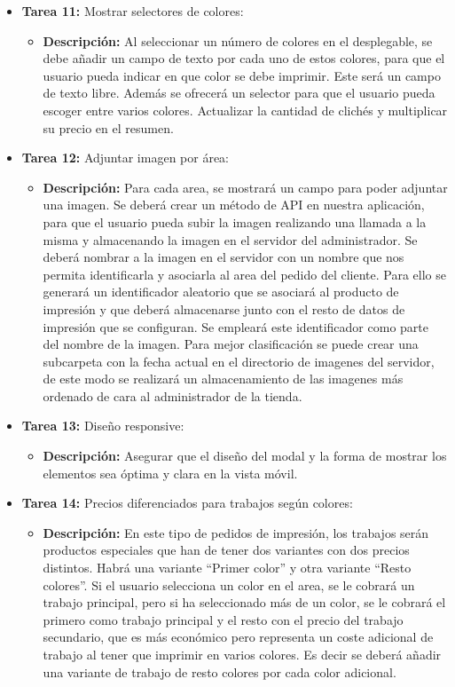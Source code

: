 \documentclass[11pt]{article}
\begin{document}
\begin{itemize}
    \item \textbf{Tarea 11:} Mostrar selectores de colores:
          \begin{itemize}[label=--]
              \item \textbf{Descripción:} Al seleccionar un número de colores en el desplegable, se debe añadir un campo de texto por cada uno de estos colores, para que el usuario pueda indicar en que color se debe imprimir. Este será un campo de texto libre. Además se ofrecerá un selector para que el usuario pueda escoger entre varios colores. Actualizar la cantidad de clichés y multiplicar su precio en el resumen.
          \end{itemize}
    \item \textbf{Tarea 12:} Adjuntar imagen por área:
          \begin{itemize}[label=--]
              \item \textbf{Descripción:} Para cada area, se mostrará un campo para poder adjuntar una imagen. Se deberá crear un método de API en nuestra aplicación, para que el usuario pueda subir la imagen realizando una llamada a la misma y almacenando la imagen en el servidor del administrador. Se deberá nombrar a la imagen en el servidor con un nombre que nos permita identificarla y asociarla al area del pedido del cliente. Para ello se generará un identificador aleatorio que se asociará al producto de impresión y que deberá almacenarse junto con el resto de datos de impresión que se configuran. Se empleará este identificador como parte del nombre de la imagen. Para mejor clasificación se puede crear una subcarpeta con la fecha actual en el directorio de imagenes del servidor, de este modo se realizará un almacenamiento de las imagenes más ordenado de cara al administrador de la tienda.
          \end{itemize}
    \item \textbf{Tarea 13:} Diseño responsive:
          \begin{itemize}[label=--]
              \item \textbf{Descripción:} Asegurar que el diseño del modal y la forma de mostrar los elementos sea óptima y clara en la vista móvil.
          \end{itemize}
    \item \textbf{Tarea 14:} Precios diferenciados para trabajos según colores:
          \begin{itemize}[label=--]
              \item \textbf{Descripción:} En este tipo de pedidos de impresión, los trabajos serán productos especiales que han de tener dos variantes con dos precios distintos. Habrá una variante ``Primer color'' y otra variante ``Resto colores''. Si el usuario selecciona un color en el area, se le cobrará un trabajo principal, pero si ha seleccionado más de un color, se le cobrará el primero como trabajo principal y el resto con el precio del trabajo secundario, que es más económico pero representa un coste adicional de trabajo al tener que imprimir en varios colores. Es decir se deberá añadir una variante de trabajo de resto colores por cada color adicional.
          \end{itemize}
\end{itemize}
\end{document}
